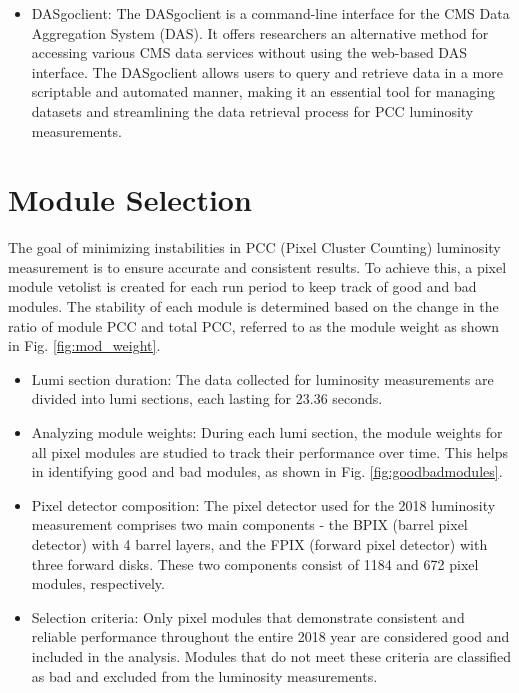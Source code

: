 \begin{itemize}
\item DASgoclient: The DASgoclient is a command-line interface for the CMS Data Aggregation System (DAS). It offers researchers an alternative method for accessing various CMS data services without using the web-based DAS interface. The DASgoclient allows users to query and retrieve data in a more scriptable and automated manner, making it an essential tool for managing datasets and streamlining the data retrieval process for PCC luminosity measurements.

\end{itemize}

\section{Module Selection}


The goal of minimizing instabilities in PCC (Pixel Cluster Counting) luminosity measurement is to ensure accurate and consistent results. To achieve this, a pixel module vetolist is created for each run period to keep track of good and bad modules. The stability of each module is determined based on the change in the ratio of module PCC and total PCC, referred to as the module weight as shown in Fig. \ref{fig:mod_weight}.

\begin{itemize}
\item Lumi section duration: The data collected for luminosity measurements are divided into lumi sections, each lasting for 23.36 seconds.

\item Analyzing module weights: During each lumi section, the module weights for all pixel modules are studied to track their performance over time. This helps in identifying good and bad modules, as shown in Fig. \ref{fig:goodbadmodules}.

\item Pixel detector composition: The pixel detector used for the 2018 luminosity measurement comprises two main components - the BPIX (barrel pixel detector) with 4 barrel layers, and the FPIX (forward pixel detector) with three forward disks. These two components consist of 1184 and 672 pixel modules, respectively.

\item Selection criteria: Only pixel modules that demonstrate consistent and reliable performance throughout the entire 2018 year are considered good and included in the analysis. Modules that do not meet these criteria are classified as bad and excluded from the luminosity measurements.
\end{itemize}

